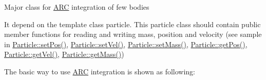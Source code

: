 Major class for \hyperlink{namespaceARC}{A\+RC} integration of few bodies

It depend on the template class particle. This particle class should contain public member functions for reading and writing mass, position and velocity (see sample in \hyperlink{classParticle_a97d76b66aed57834c105b78b10643b81}{Particle\+::set\+Pos()}, \hyperlink{classParticle_a07c405254ac3f03854e7523ff473c828}{Particle\+::set\+Vel()}, \hyperlink{classParticle_a620f479862b90468a77da4e9cf5c0ff5}{Particle\+::set\+Mass()}, \hyperlink{classParticle_a4ec76421cddd91b1f27357fb182f6923}{Particle\+::get\+Pos()}, \hyperlink{classParticle_ab3d63df7f8c22f232b096ae33b6ea3ac}{Particle\+::get\+Vel()}, \hyperlink{classParticle_a2576aff503f68e78ced91406512b1255}{Particle\+::get\+Mass()})

The basic way to use \hyperlink{namespaceARC}{A\+RC} integration is shown as following\+:
